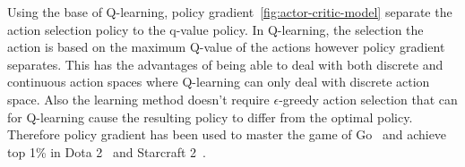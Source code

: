 Using the base of Q-learning, policy gradient~\ref{fig:actor-critic-model} separate the action selection policy to the
q-value policy. In Q-learning, the selection the action is based on the maximum Q-value of the actions however policy
gradient separates. This has the advantages of being able to deal with both discrete and continuous action spaces where
Q-learning can only deal with discrete action space. Also the learning method doesn't require $\epsilon$-greedy action
selection that can for Q-learning cause the resulting policy to differ from the optimal policy. Therefore policy
gradient has been used to master the game of Go~\citep{silver2017mastering} and achieve top 1\% in
Dota 2~\citep{OpenAI_dota} and Starcraft 2~\citep{starcraft2}.